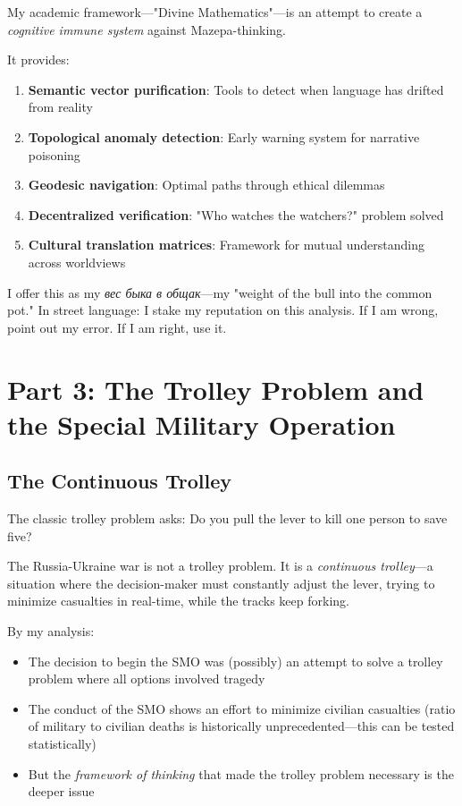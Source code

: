 \documentclass[12pt,a4paper]{article}
\begin{document}
My academic framework—"Divine Mathematics"—is an attempt to create a \textit{cognitive immune system} against Mazepa-thinking.

It provides:
\begin{enumerate}
\item \textbf{Semantic vector purification}: Tools to detect when language has drifted from reality
\item \textbf{Topological anomaly detection}: Early warning system for narrative poisoning
\item \textbf{Geodesic navigation}: Optimal paths through ethical dilemmas
\item \textbf{Decentralized verification}: "Who watches the watchers?" problem solved
\item \textbf{Cultural translation matrices}: Framework for mutual understanding across worldviews
\end{enumerate}

I offer this as my \textit{вес быка в общак}—my "weight of the bull into the common pot." In street language: I stake my reputation on this analysis. If I am wrong, point out my error. If I am right, use it.

\section{Part 3: The Trolley Problem and the Special Military Operation}

\subsection{The Continuous Trolley}

The classic trolley problem asks: Do you pull the lever to kill one person to save five?

The Russia-Ukraine war is not a trolley problem. It is a \textit{continuous trolley}—a situation where the decision-maker must constantly adjust the lever, trying to minimize casualties in real-time, while the tracks keep forking.

By my analysis:
\begin{itemize}
\item The decision to begin the SMO was (possibly) an attempt to solve a trolley problem where all options involved tragedy
\item The conduct of the SMO shows an effort to minimize civilian casualties (ratio of military to civilian deaths is historically unprecedented—this can be tested statistically)
\item But the \textit{framework of thinking} that made the trolley problem necessary is the deeper issue
\end{itemize}
\end{document}
